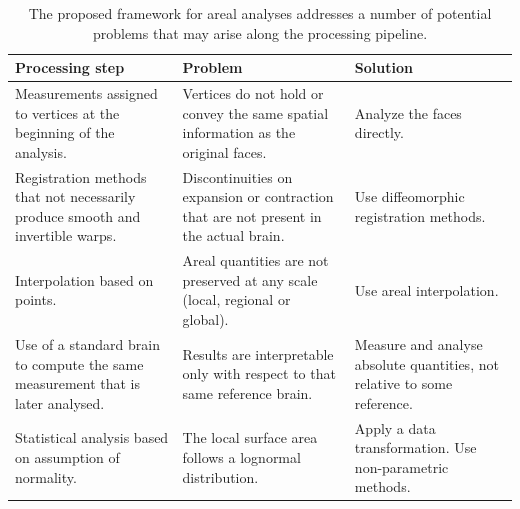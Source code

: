 \begin{table}[!p]
\caption[Problems solved by the proposed method.]{The proposed framework for areal analyses addresses a number of potential problems that may arise along the processing pipeline.}
\begin{center}
{\small
\begin{tabular}{@{}m{42mm}<{\raggedright}m{44mm}<{\raggedright}m{43mm}<{\raggedright}@{}}
\toprule
\textbf{Processing step} &
\textbf{Problem} &
\textbf{Solution} \\
\midrule
Measurements assigned to vertices at the beginning of the analysis. &
Vertices do not hold or convey the same spatial information as the original faces. &
Analyze the faces directly. \\
\midrule
Registration methods that not necessarily produce smooth and invertible warps. &
Discontinuities on expansion or contraction that are not present in the actual brain. &
Use diffeomorphic registration methods. \\
\midrule
Interpolation based on points. &
Areal quantities are not preserved at any scale (local, regional or global). &
Use areal interpolation. \\
\midrule
Use of a standard brain to compute the same measurement that is later analysed. &
Results are interpretable only with respect to that same reference brain. &
Measure and analyse absolute quantities, not relative to some reference. \\
\midrule
Statistical analysis based on assumption of normality. &
The local surface area follows a lognormal distribution. &
Apply a data transformation. Use non-parametric methods. \\
\bottomrule
\end{tabular}}
\end{center}
\label{tab:compare}
\end{table}


